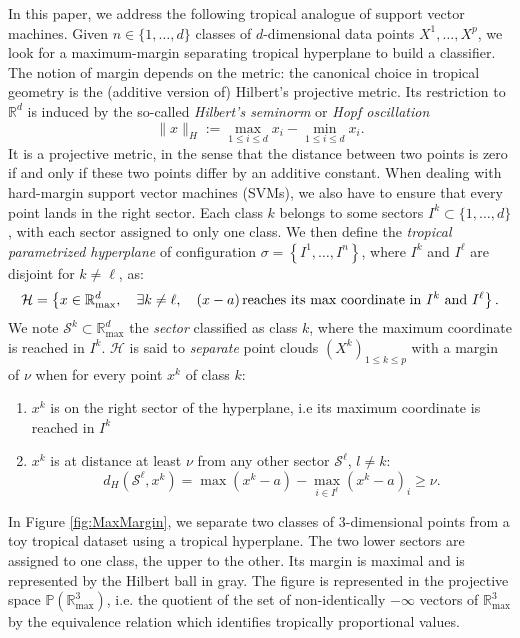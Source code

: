 \documentclass[oneside,english,a4paper]{amsart}
\numberwithin{equation}{section}
\numberwithin{figure}{section}
\theoremstyle{plain}
\theoremstyle{definition}
\theoremstyle{plain}
\theoremstyle{remark}
\theoremstyle{plain}
\theoremstyle{definition}
\theoremstyle{definition}
\begin{document}
In this paper, we address the following tropical analogue of support
vector machines. Given $n\in\{1,\ldots, d\}$ classes of $d$-dimensional data
points $X^{1},\ldots,X^{p}$, we look for a maximum-margin separating
tropical hyperplane to build a classifier. The notion of margin depends
on the metric: the canonical choice in tropical geometry is the (additive
version of) Hilbert's projective metric. Its restriction to $\mathbb{R}^{d}$
is induced by the so-called \emph{Hilbert's seminorm} or \emph{Hopf
oscillation}
\[
\lVert x\rVert_{H}:=\max_{1\le i\le d}x_{i}-\min_{1\le i\le d}x_{i}.
\]
It is a projective metric, in the sense that the distance between
two points is zero if and only if these two points differ by an additive
constant. When dealing with hard-margin support vector machines (SVMs),
we also have to ensure that every point lands in the right sector. Each class $k$ belongs to some sectors $I^k\subset \{1,\ldots, d\}$, with each sector assigned to only one class. We then define the \emph{tropical parametrized hyperplane} of configuration
$\sigma=\left\{I^{1},\ldots,I^{n}\right\}$, where $I^{k}$ and $I^{\ell}$
are disjoint for $k\ne\ell$, as:
\[
\mathcal{H}=\left\{x\in\mathbb{R}_{\max}^{d},\quad\exists k\ne\ell,\quad (x-a)\,\text{reaches its max coordinate in \ensuremath{I^{k}} and \ensuremath{I^{\ell}}}\right\}.
\]
We note $\mathcal{S}^k\subset \mathbb{R}_{\max}^d$ the \emph{sector} classified as class $k$, where the maximum coordinate is reached in $I^k$. $\mathcal{H}$ is said to \emph{separate} point
clouds $(X^{k})_{1\le k\le p}$ with a margin of $\nu$ when for every point
$x^{k}$ of class $k$:
\begin{enumerate}
\item $x^{k}$ is on the right sector of the hyperplane, i.e its maximum
coordinate is reached in $I^{k}$
\item $x^{k}$ is at distance at least $\nu$ from any other sector $\mathcal{S}^\ell$, $l \ne k$: %
\begin{equation*}
d_H(\mathcal{S}^\ell,x^{k})=\max(x^{k}-a)-\max_{i\in I^\ell}(x^{k}-a)_i\ge\nu.
\end{equation*}
\end{enumerate}

In Figure \ref{fig:MaxMargin}, we separate two classes
of $3$-dimensional points from a toy tropical dataset using a tropical
hyperplane. The two lower sectors are assigned to one class, the upper to the other. Its margin is maximal and is represented by the Hilbert
ball in gray. The figure is represented in the projective space $\mathbb{P}\left(\mathbb{R}_{\text{max}}^{3}\right)$,
i.e. the quotient of the set of non-identically $-\infty$ vectors
of $\mathbb{R}_{\text{max}}^{3}$ by the equivalence relation which
identifies tropically proportional values.
\end{document}

